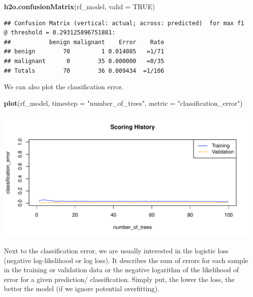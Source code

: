 \documentclass[]{article}
\newenvironment{Shaded}{\begin{snugshade}}{\end{snugshade}}
\newcommand{\KeywordTok}[1]{\textcolor[rgb]{0.13,0.29,0.53}{\textbf{{#1}}}}
\newcommand{\DataTypeTok}[1]{\textcolor[rgb]{0.13,0.29,0.53}{{#1}}}
\newcommand{\StringTok}[1]{\textcolor[rgb]{0.31,0.60,0.02}{{#1}}}
\newcommand{\OtherTok}[1]{\textcolor[rgb]{0.56,0.35,0.01}{{#1}}}
\newcommand{\NormalTok}[1]{{#1}}
\begin{document}
\begin{Shaded}
\begin{Highlighting}[]
\KeywordTok{h2o.confusionMatrix}\NormalTok{(rf_model, }\DataTypeTok{valid =} \OtherTok{TRUE}\NormalTok{)}
\end{Highlighting}
\end{Shaded}

\begin{verbatim}
## Confusion Matrix (vertical: actual; across: predicted)  for max f1 @ threshold = 0.293125896751881:
##           benign malignant    Error    Rate
## benign        70         1 0.014085   =1/71
## malignant      0        35 0.000000   =0/35
## Totals        70        36 0.009434  =1/106
\end{verbatim}

We can also plot the classification error.

\begin{Shaded}
\begin{Highlighting}[]
\KeywordTok{plot}\NormalTok{(rf_model,}
     \DataTypeTok{timestep =} \StringTok{"number_of_trees"}\NormalTok{,}
     \DataTypeTok{metric =} \StringTok{"classification_error"}\NormalTok{)}
\end{Highlighting}
\end{Shaded}

\begin{center}\includegraphics{webinar_code_files/figure-latex/unnamed-chunk-53-1} \end{center}

Next to the classification error, we are usually interested in the
logistic loss (negative log-likelihood or log loss). It describes the
sum of errors for each sample in the training or validation data or the
negative logarithm of the likelihood of error for a given prediction/
classification. Simply put, the lower the loss, the better the model (if
we ignore potential overfitting).
\end{document}
